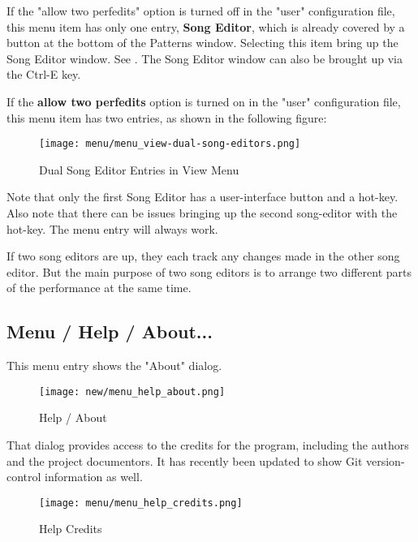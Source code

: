    If the "allow two perfedits" option is turned off in the "user"
   configuration file, this menu item has only one entry, \textbf{Song Editor}, 
   which is already covered by a button at the bottom of the Patterns
   window.  Selecting this item bring up the Song Editor window.
   See .
   The Song Editor window can also be brought up via the
   Ctrl-E key.

   If the \textbf{allow two perfedits} option is turned on in the "user"
   configuration file, this menu item has two entries, as shown in the
   following figure:

\begin{figure}[H]
   \centering 
   \texttt{[image: menu/menu\_view-dual-song-editors.png]}
   \caption{Dual Song Editor Entries in View Menu}
   \label{fig:seq64_menu_view_song_editors}
\end{figure}

   Note that only the first Song Editor has a user-interface button and
   a hot-key.  Also note that there can be issues bringing up the second
   song-editor with the hot-key.  The menu entry will always work.

   If two song editors are up, they each track any changes made in the other
   song editor.  But the main purpose of two song editors is to arrange two
   different parts of the performance at the same time.

\subsection{Menu / Help / About...}
\label{subsec:seq64_menu_about}

   This menu entry shows the "About" dialog.

\begin{figure}[H]
   \centering 
   \texttt{[image: new/menu\_help\_about.png]}
   \caption{Help / About}
   \label{fig:seq64_menu_help_about}
\end{figure}

   That dialog provides access to the credits for the program, including the
   authors and the project documentors.  It has recently been updated
   to show Git version-control information as well.

\begin{figure}[H]
   \centering 
   \texttt{[image: menu/menu\_help\_credits.png]}
   \caption{Help Credits}
   \label{fig:seq64_menu_help_credits}
\end{figure}

